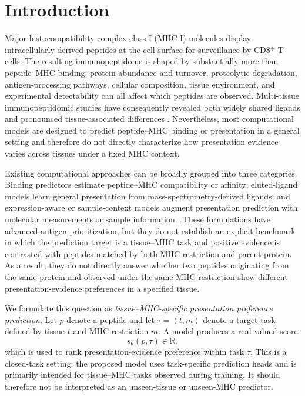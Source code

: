 \section{Introduction}

Major histocompatibility complex class I (MHC-I) molecules display intracellularly derived peptides at the cell surface for surveillance by CD8\(^{+}\) T cells. The resulting immunopeptidome is shaped by substantially more than peptide--MHC binding: protein abundance and turnover, proteolytic degradation, antigen-processing pathways, cellular composition, tissue environment, and experimental detectability can all affect which peptides are observed. Multi-tissue immunopeptidomic studies have consequently revealed both widely shared ligands and pronounced tissue-associated differences \cite{marcu2021atlas,schuster2018mouse}. Nevertheless, most computational models are designed to predict peptide--MHC binding or presentation in a general setting and therefore do not directly characterize how presentation evidence varies across tissues under a fixed MHC context.

Existing computational approaches can be broadly grouped into three categories. Binding predictors estimate peptide--MHC compatibility or affinity; eluted-ligand models learn general presentation from mass-spectrometry-derived ligands; and expression-aware or sample-context models augment presentation prediction with molecular measurements or sample information \cite{reynisson2020netmhcpan,odonnell2020mhcflurry,albert2023bigmhc}. These formulations have advanced antigen prioritization, but they do not establish an explicit benchmark in which the prediction target is a tissue--MHC task and positive evidence is contrasted with peptides matched by both MHC restriction and parent protein. As a result, they do not directly answer whether two peptides originating from the same protein and observed under the same MHC restriction show different presentation-evidence preferences in a specified tissue.

We formulate this question as \emph{tissue--MHC-specific presentation preference prediction}. Let \(p\) denote a peptide and let \(\tau=(t,m)\) denote a target task defined by tissue \(t\) and MHC restriction \(m\). A model produces a real-valued score
\[
s_{\theta}(p,\tau)\in\mathbb{R},
\]
which is used to rank presentation-evidence preference within task \(\tau\). This is a closed-task setting: the proposed model uses task-specific prediction heads and is primarily intended for tissue--MHC tasks observed during training. It should therefore not be interpreted as an unseen-tissue or unseen-MHC predictor.

